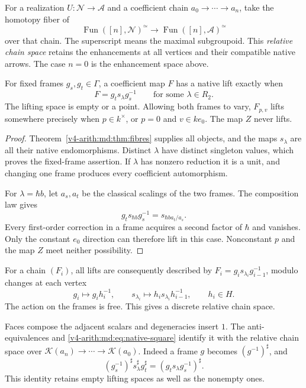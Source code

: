 For a realization $U:\mathcal N\to\mathcal A$ and a
coefficient chain $a_0\to\cdots\to a_n$, take the
homotopy fiber of
\[
 \operatorname{Fun}([n],\mathcal N)^\simeq
 \longrightarrow\operatorname{Fun}([n],\mathcal A)^\simeq
\]
over that chain. The superscript means the maximal
subgroupoid. This \emph{relative chain space} retains
the enhancements at all vertices and their compatible
native arrows. The case $n=0$ is the enhancement
space above.

\begin{proposition}
\label{v4-arith:md:prop:arrows}
For fixed frames $g_s,g_t\in\Gamma$, a coefficient
map $F$ has a native lift exactly when
\begin{equation}\label{v4-arith:md:eq:lift}
 F=g_t s_\lambda g_s^{-1}
 \qquad\text{for some }\lambda\in R_2.
\end{equation}
The lifting space is empty or a point.
Allowing both frames to vary, $F_{p,v}$ lifts
somewhere precisely when $p\in k^\times$, or
$p=0$ and $v\in ke_0$. The map $Z$ never lifts.
\end{proposition}

\begin{proof}
Theorem~\ref{v4-arith:md:thm:fibres} supplies all
objects, and the maps $s_\lambda$ are all their
native endomorphisms. Distinct $\lambda$ have
distinct singleton values, which proves the
fixed-frame assertion. If $\lambda$ has nonzero
reduction it is a unit, and changing one frame
produces every coefficient automorphism.

For $\lambda=\hbar b$, let $a_s,a_t$ be the
classical scalings of the two frames. The
composition law gives
\[
 g_t s_{\hbar b}g_s^{-1}
 =s_{\hbar b a_t/a_s}.
\]
Every first-order correction in a frame acquires
a second factor of $\hbar$ and vanishes.
Only the constant $e_0$ direction can therefore
lift in this case. Nonconstant $p$ and the map
$Z$ meet neither possibility.
\end{proof}

For a chain $(F_i)$, all lifts are consequently
described by $F_i=g_i s_{\lambda_i}g_{i-1}^{-1}$,
modulo changes at each vertex
\[
 g_i\mapsto g_i h_i^{-1},\qquad
 s_{\lambda_i}\mapsto h_i s_{\lambda_i}h_{i-1}^{-1},
 \qquad h_i\in H.
\]
The action on the frames is free. This gives a
discrete relative chain space.

Faces compose
the adjacent scalars and degeneracies insert $1$.
The anti-equivalences and
\eqref{v4-arith:md:eq:native-square} identify it
with the relative chain space over
$\mathcal K(a_n)\to\cdots\to\mathcal K(a_0)$.
Indeed a frame $g$ becomes $(g^{-1})^\sharp$, and
\[
 (g_s^{-1})^\sharp s_\lambda^\sharp g_t^\sharp
 =(g_t s_\lambda g_s^{-1})^\sharp.
\]
This identity retains empty lifting spaces as well
as the nonempty ones.

